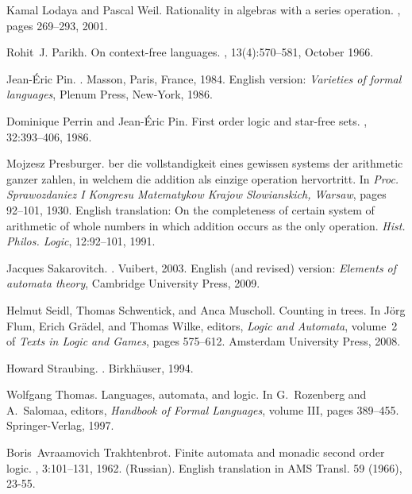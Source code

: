 \documentclass{CSML}
\begin{document}
\begin{thebibliography}{LW98b}
Kamal Lodaya and Pascal Weil.
\newblock Rationality in algebras with a series operation.
, pages 269--293, 2001.

Rohit~J. Parikh.
\newblock On context-free languages.
, 13(4):570--581, October 1966.

Jean-{\'E}ric Pin.
.
\newblock Masson, Paris, France, 1984.
\newblock English version: {\it Varieties of formal languages}, Plenum Press,
  New-York, 1986.

Dominique Perrin and Jean-{\'E}ric Pin.
\newblock First order logic and star-free sets.
, 32:393--406, 1986.

Mojzesz Presburger.
ber die vollstandigkeit eines gewissen systems der arithmetic
  ganzer zahlen, in welchem die addition als einzige operation hervortritt.
\newblock In {\em Proc. Sprawozdaniez I Kongresu Matematykow Krajow
  Slowianskich, Warsaw}, pages 92--101, 1930.
\newblock English translation: On the completeness of certain system of
  arithmetic of whole numbers in which addition occurs as the only operation.
  {\em Hist. Philos. Logic}, 12:92--101, 1991.

Jacques Sakarovitch.
.
\newblock Vuibert, 2003.
\newblock English (and revised) version: {\it Elements of automata theory},
  Cambridge University Press, 2009.

Helmut Seidl, Thomas Schwentick, and Anca Muscholl.
\newblock Counting in trees.
\newblock In J{\"o}rg Flum, Erich Gr{\"a}del, and Thomas Wilke, editors, {\em
  Logic and Automata}, volume~2 of {\em Texts in Logic and Games}, pages
  575--612. Amsterdam University Press, 2008.

Howard Straubing.
.
\newblock Birkh{\"a}user, 1994.

Wolfgang Thomas.
\newblock Languages, automata, and logic.
\newblock In G.~Rozenberg and A.~Salomaa, editors, {\em Handbook of Formal
  Languages}, volume III, pages 389--455. Springer-Verlag, 1997.

Boris~Avraamovich Trakhtenbrot.
\newblock Finite automata and monadic second order logic.
, 3:101--131, 1962.
\newblock (Russian). English translation in AMS Transl. 59 (1966), 23-55.


\end{thebibliography}
\end{document}
